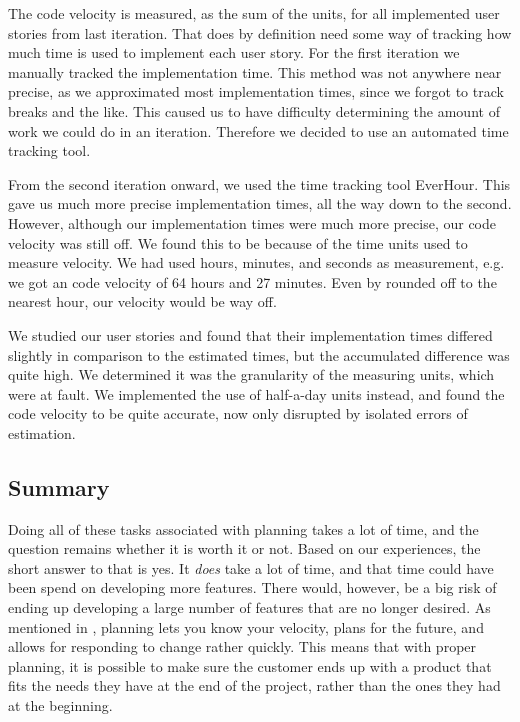 The code velocity is measured, as the sum of the units, for all implemented user stories from last iteration.
That does by definition need some way of tracking how much time is used to implement each user story.
For the first iteration we manually tracked the implementation time. This method was not anywhere near precise, as we approximated most implementation times, since we forgot to track breaks and the like. This caused us to have difficulty determining the amount of work we could do in an iteration. Therefore we decided to use an automated time tracking tool.

From the second iteration onward, we used the time tracking tool EverHour. 
This gave us much more precise implementation times, all the way down to the second.
However, although our implementation times were much more precise, our code velocity was still off.
We found this to be because of the time units used to measure velocity.
We had used hours, minutes, and seconds as measurement, e.g. we got an code velocity of 64 hours and 27 minutes.
Even by rounded off to the nearest hour, our velocity would be way off.

We studied our user stories and found that their implementation times differed slightly in comparison to the estimated times, but the accumulated difference was quite high.
We determined it was the granularity of the measuring units, which were at fault.
We implemented the use of half-a-day units instead, and found the code velocity to be quite accurate, now only disrupted by isolated errors of estimation.

\subsection{Summary}
Doing all of these tasks associated with planning takes a lot of time, and the question remains whether it is worth it or not.
Based on our experiences, the short answer to that is yes.
It \textit{does} take a lot of time, and that time could have been spend on developing more features.
There would, however, be a big risk of ending up developing a large number of features that are no longer desired.
As mentioned in , planning lets you know your velocity, plans for the future, and allows for responding to change rather quickly.
This means that with proper planning, it is possible to make sure the customer ends up with a product that fits the needs they have at the end of the project, rather than the ones they had at the beginning.